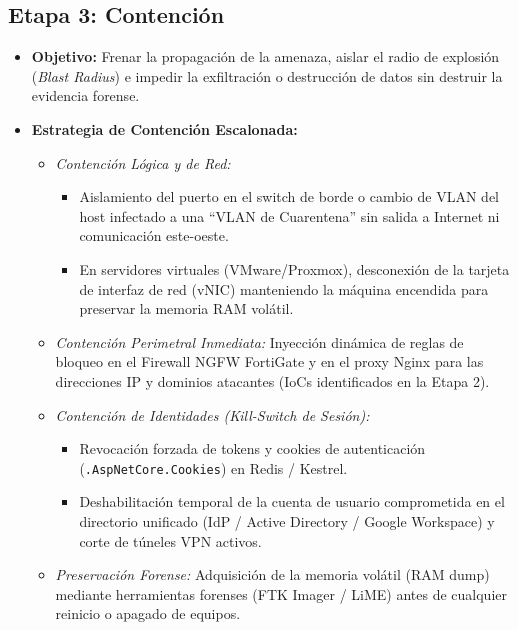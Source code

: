 \subsection{Etapa 3: Contención}

\begin{itemize}
    \item \textbf{Objetivo:} Frenar la propagación de la amenaza, aislar el radio de explosión (\textit{Blast Radius}) e impedir la exfiltración o destrucción de datos sin destruir la evidencia forense.
    \item \textbf{Estrategia de Contención Escalonada:}
    \begin{itemize}
        \item \textit{Contención Lógica y de Red:}
        \begin{itemize}
            \item Aislamiento del puerto en el switch de borde o cambio de VLAN del host infectado a una ``VLAN de Cuarentena'' sin salida a Internet ni comunicación este-oeste.
            \item En servidores virtuales (VMware/Proxmox), desconexión de la tarjeta de interfaz de red (vNIC) manteniendo la máquina encendida para preservar la memoria RAM volátil.
        \end{itemize}
        \item \textit{Contención Perimetral Inmediata:} Inyección dinámica de reglas de bloqueo en el Firewall NGFW FortiGate y en el proxy Nginx para las direcciones IP y dominios atacantes (IoCs identificados en la Etapa 2).
        \item \textit{Contención de Identidades (Kill-Switch de Sesión):}
        \begin{itemize}
            \item Revocación forzada de tokens y cookies de autenticación (\texttt{.AspNetCore.Cookies}) en Redis / Kestrel.
            \item Deshabilitación temporal de la cuenta de usuario comprometida en el directorio unificado (IdP / Active Directory / Google Workspace) y corte de túneles VPN activos.
        \end{itemize}
        \item \textit{Preservación Forense:} Adquisición de la memoria volátil (RAM dump) mediante herramientas forenses (FTK Imager / LiME) antes de cualquier reinicio o apagado de equipos.
    \end{itemize}
\end{itemize}

